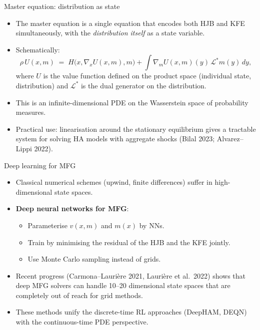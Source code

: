 \documentclass[10pt,english,aspectratio=169]{beamer}
\begin{document}
\begin{frame}{Master equation: distribution as state}
\begin{itemize}
\item The master equation is a single equation that encodes both HJB and KFE simultaneously, with the \emph{distribution itself} as a state variable.
\medskip
\item Schematically:
\[
\rho\, U(x, m) \;=\; H\!\big(x, \nabla_x U(x,m), m\big) + \int \nabla_m U(x,m)(y)\, \mathcal L^* m(y)\, dy,
\]
where $U$ is the value function defined on the product space (individual state, distribution) and $\mathcal L^*$ is the dual generator on the distribution.
\medskip
\item This is an infinite-dimensional PDE on the Wasserstein space of probability measures.
\medskip
\item Practical use: linearisation around the stationary equilibrium gives a tractable system for solving HA models with aggregate shocks (Bilal 2023; Alvarez--Lippi 2022).
\end{itemize}
\end{frame}

\begin{frame}{Deep learning for MFG}
\begin{itemize}
\item Classical numerical schemes (upwind, finite differences) suffer in high-dimensional state spaces.
\medskip
\item \textbf{Deep neural networks for MFG}:
  \begin{itemize}
  \item Parameterise $v(x, m)$ and $m(x)$ by NNs.
  \item Train by minimising the residual of the HJB and the KFE jointly.
  \item Use Monte Carlo sampling instead of grids.
  \end{itemize}
\medskip
\item Recent progress (Carmona--Lauri\`ere 2021, Lauri\`ere et al.\ 2022) shows that deep MFG solvers can handle 10--20 dimensional state spaces that are completely out of reach for grid methods.
\medskip
\item These methods unify the discrete-time RL approaches (DeepHAM, DEQN) with the continuous-time PDE perspective.
\end{itemize}
\end{frame}
\end{document}

